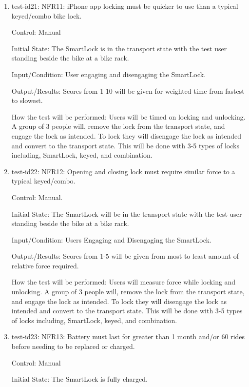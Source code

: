 \documentclass[12pt, titlepage]{article}
\begin{document}
\begin{enumerate}

\item{test-id21: NFR11: iPhone app locking must be quicker to use than a typical keyed/combo bike lock.  \\}

Control: Manual 

Initial State: The SmartLock is in the transport state with the test user standing beside the bike at a bike rack.

Input/Condition: User engaging and disengaging the SmartLock.

Output/Results: Scores from 1-10 will be given for weighted time from fastest to slowest.

How the test will be performed: Users will be timed on locking and unlocking. A group of 3 people will, remove the lock from the transport state, and engage the lock as intended. To lock they will disengage the lock as intended and convert to the transport state. This will be done with 3-5 types of locks including, SmartLock, keyed, and combination.

\item{test-id22: NFR12: Opening and closing lock must require similar force to a typical keyed/combo.  \\}

Control: Manual.

Initial State: The SmartLock will be in the transport state with the test user standing beside the bike at a bike rack.

Input/Condition: Users Engaging and Disengaging the SmartLock.

Output/Results: Scores from 1-5 will be given from most to least amount of relative force required.

How the test will be performed: Users will measure force while locking and unlocking. A group of 3 people will, remove the lock from the transport state, and engage the lock as intended. To lock they will disengage the lock as intended and convert to the transport state. This will be done with 3-5 types of locks including, SmartLock, keyed, and combination.

\item{test-id23: NFR13: Battery must last for greater than 1 month and/or 60 rides before needing to be replaced or charged.  \\}

Control: Manual 

Initial State: The SmartLock is fully charged.


\end{enumerate}
\end{document}
